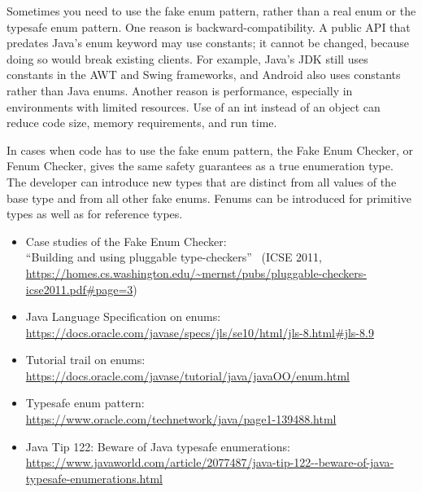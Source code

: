 Sometimes you need to use the fake enum pattern,
rather than a real enum or the typesafe enum pattern.
%
One reason is backward-compatibility.  A public API that predates Java's
enum keyword may use  constants; it cannot be changed, because
doing so would break existing clients.  For example, Java's JDK still uses
 constants in the AWT and Swing frameworks, and Android also uses
 constants rather than Java enums.
%
Another reason is performance, especially in environments with limited
resources.  Use of an int instead of an object can
reduce code size, memory requirements, and run time.

In cases when code has to use the fake enum pattern, the Fake Enum Checker,
or Fenum Checker, gives the same safety guarantees as a true enumeration type.
The developer can introduce new types that are distinct from all values of the
base type and from all other fake enums. Fenums can be introduced for
primitive types as well as for reference types.



\begin{itemize}
\item Case studies of the Fake Enum Checker:\\
  ``Building and using pluggable type-checkers''~\cite{DietlDEMS2011}
  (ICSE 2011, \url{https://homes.cs.washington.edu/~mernst/pubs/pluggable-checkers-icse2011.pdf#page=3})

\item Java Language Specification on enums:\\
  \url{https://docs.oracle.com/javase/specs/jls/se10/html/jls-8.html#jls-8.9}

\item Tutorial trail on enums:\\
  \url{https://docs.oracle.com/javase/tutorial/java/javaOO/enum.html}

\item Typesafe enum pattern:\\
  \url{https://www.oracle.com/technetwork/java/page1-139488.html}

\item Java Tip 122: Beware of Java typesafe enumerations:\\
  \url{https://www.javaworld.com/article/2077487/java-tip-122--beware-of-java-typesafe-enumerations.html}

\end{itemize}

